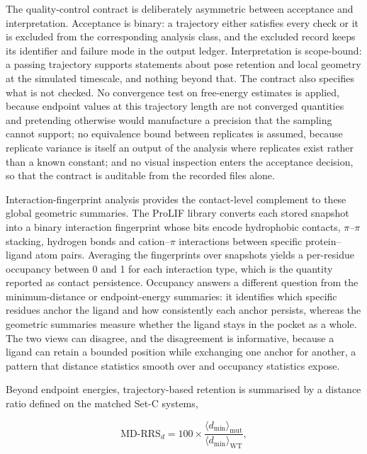 The quality-control contract is deliberately asymmetric between acceptance and interpretation. Acceptance is binary: a trajectory either satisfies every check or it is excluded from the corresponding analysis class, and the excluded record keeps its identifier and failure mode in the output ledger. Interpretation is scope-bound: a passing trajectory supports statements about pose retention and local geometry at the simulated timescale, and nothing beyond that. The contract also specifies what is not checked. No convergence test on free-energy estimates is applied, because endpoint values at this trajectory length are not converged quantities and pretending otherwise would manufacture a precision that the sampling cannot support; no equivalence bound between replicates is assumed, because replicate variance is itself an output of the analysis where replicates exist rather than a known constant; and no visual inspection enters the acceptance decision, so that the contract is auditable from the recorded files alone.

Interaction-fingerprint analysis provides the contact-level complement to these global geometric summaries. The ProLIF library converts each stored snapshot into a binary interaction fingerprint whose bits encode hydrophobic contacts, $\pi$--$\pi$ stacking, hydrogen bonds and cation--$\pi$ interactions between specific protein--ligand atom pairs\cite{Bouysset2021}. Averaging the fingerprints over snapshots yields a per-residue occupancy between \num{0} and \num{1} for each interaction type, which is the quantity reported as contact persistence. Occupancy answers a different question from the minimum-distance or endpoint-energy summaries: it identifies which specific residues anchor the ligand and how consistently each anchor persists, whereas the geometric summaries measure whether the ligand stays in the pocket as a whole. The two views can disagree, and the disagreement is informative, because a ligand can retain a bounded position while exchanging one anchor for another, a pattern that distance statistics smooth over and occupancy statistics expose.

Beyond endpoint energies, trajectory-based retention is summarised by a distance ratio defined on the matched Set-C systems,

\begin{equation}
\mathrm{MD\text{-}RRS}_{d} = 100 \times \frac{\langle d_{\min} \rangle_{\mathrm{mut}}}{\langle d_{\min} \rangle_{\mathrm{WT}}},
\label{eq:mdrrs}
\end{equation}


